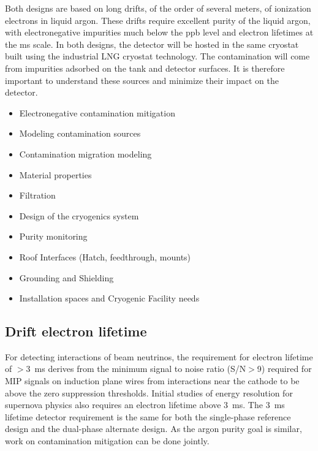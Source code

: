 Both designs are based on long drifts, of the order of several meters,
of ionization electrons in liquid argon. These drifts require
excellent purity of the liquid argon, with electronegative impurities
much below the ppb level and electron lifetimes at the ms scale. In
both designs, the detector will be hosted in the same cryostat built
using the industrial LNG cryostat technology. The contamination will
come from impurities adsorbed on the tank and detector surfaces. It is
therefore important to understand these sources and minimize their
impact on the detector.
\begin{itemize}
\item Electronegative contamination mitigation	
\item Modeling contamination sources
\item Contamination migration modeling
\item Material properties
\item Filtration	
\item Design of the cryogenics system
\item Purity monitoring	
\item Roof Interfaces (Hatch, feedthrough, mounts)	
\item Grounding	and Shielding
\item Installation spaces and Cryogenic Facility needs	
\end{itemize}

\subsection{Drift electron lifetime}
\label{sec:detectors-synergy-lifetime}

For detecting interactions of beam neutrinos, the requirement for
electron lifetime of $>$3~ms derives from the minimum signal to noise
ratio (S/N$>$9) required for MIP signals on induction plane wires from
interactions near the cathode to be above the zero suppression
thresholds.  Initial studies of energy resolution for supernova physics
also requires an electron lifetime above 3~ms.  The 3~ms lifetime
detector requirement is the same for both the single-phase reference
design and the dual-phase alternate design.  As the argon purity goal
is similar, work on contamination mitigation can be done jointly.


